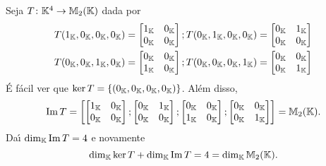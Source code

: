 \begin{exemplo}
  Seja $T \colon \mathbb{K}^4 \to \mathbb{M}_2(\mathbb{K})$ dada por
  \begin{align*}
    T(1_{\mathbb{K}},0_{\mathbb{K}},0_{\mathbb{K}},0_{\mathbb{K}}) &= \begin{bmatrix}
      1_{\mathbb{K}} & 0_{\mathbb{K}}\\
      0_{\mathbb{K}} & 0_{\mathbb{K}}
    \end{bmatrix}; T(0_{\mathbb{K}},1_{\mathbb{K}},0_{\mathbb{K}},0_{\mathbb{K}}) = \begin{bmatrix}
      0_{\mathbb{K}} & 1_{\mathbb{K}}\\
      0_{\mathbb{K}} & 0_{\mathbb{K}}
    \end{bmatrix}\\
    T(0_{\mathbb{K}},0_{\mathbb{K}},1_{\mathbb{K}},0_{\mathbb{K}}) &= \begin{bmatrix}
      0_{\mathbb{K}} & 0_{\mathbb{K}}\\
      1_{\mathbb{K}} & 0_{\mathbb{K}}
    \end{bmatrix}; T(0_{\mathbb{K}},0_{\mathbb{K}},0_{\mathbb{K}},1_{\mathbb{K}}) = \begin{bmatrix}
      0_{\mathbb{K}} & 0_{\mathbb{K}}\\
      0_{\mathbb{K}} & 1_{\mathbb{K}}
    \end{bmatrix}\\
  \end{align*}
  \'E f\'acil ver que $\ker T = \{(0_{\mathbb{K}},0_{\mathbb{K}},0_{\mathbb{K}},0_{\mathbb{K}})\}$. Al\'em disso,
  \[
    {\rm Im\,} T = \left[\begin{bmatrix}
      1_{\mathbb{K}} & 0_{\mathbb{K}}\\
      0_{\mathbb{K}} & 0_{\mathbb{K}}
    \end{bmatrix};\begin{bmatrix}
      0_{\mathbb{K}} & 1_{\mathbb{K}}\\
      0_{\mathbb{K}} & 0_{\mathbb{K}}
    \end{bmatrix};\begin{bmatrix}
      0_{\mathbb{K}} & 0_{\mathbb{K}}\\
      1_{\mathbb{K}} & 0_{\mathbb{K}}
    \end{bmatrix};\begin{bmatrix}
      0_{\mathbb{K}} & 0_{\mathbb{K}}\\
      0_{\mathbb{K}} & 1_{\mathbb{K}}
    \end{bmatrix}\right] = \mathbb{M}_2(\mathbb{K}).
  \]
  Da{\'\i} $\dim_{\mathbb{K}}{\rm Im\,} T = 4$ e novamente
  \[
    \dim_{\mathbb{K}}\ker T + \dim_{\mathbb{K}}{\rm Im\,} T = 4 = \dim_{\mathbb{K}}\mathbb{M}_2(\mathbb{K}).
  \]
\end{exemplo}

